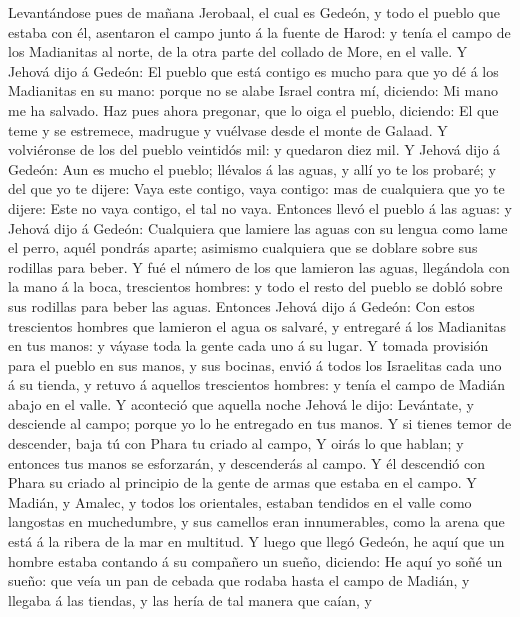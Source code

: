  Levantándose pues de mañana Jerobaal, el cual es Gedeón,
y todo el pueblo que estaba con él, asentaron el campo junto á la fuente
de Harod: y tenía el campo de los Madianitas al norte, de la otra parte
del collado de More, en el valle.  Y Jehová dijo á Gedeón:
El pueblo que está contigo es mucho para que yo dé á los Madianitas en
su mano: porque no se alabe Israel contra mí, diciendo: Mi mano me ha
salvado.  Haz pues ahora pregonar, que lo oiga el pueblo,
diciendo: El que teme y se estremece, madrugue y vuélvase desde el monte
de Galaad. Y volviéronse de los del pueblo veintidós mil: y quedaron
diez mil.  Y Jehová dijo á Gedeón: Aun es mucho el pueblo;
llévalos á las aguas, y allí yo te los probaré; y del que yo te dijere:
Vaya este contigo, vaya contigo: mas de cualquiera que yo te dijere:
Este no vaya contigo, el tal no vaya.  Entonces llevó el
pueblo á las aguas: y Jehová dijo á Gedeón: Cualquiera que lamiere las
aguas con su lengua como lame el perro, aquél pondrás aparte; asimismo
cualquiera que se doblare sobre sus rodillas para beber. 
Y fué el número de los que lamieron las aguas, llegándola con la mano á
la boca, trescientos hombres: y todo el resto del pueblo se dobló sobre
sus rodillas para beber las aguas.  Entonces Jehová dijo á
Gedeón: Con estos trescientos hombres que lamieron el agua os salvaré, y
entregaré á los Madianitas en tus manos: y váyase toda la gente cada uno
á su lugar.  Y tomada provisión para el pueblo en sus
manos, y sus bocinas, envió á todos los Israelitas cada uno á su tienda,
y retuvo á aquellos trescientos hombres: y tenía el campo de Madián
abajo en el valle.  Y aconteció que aquella noche Jehová
le dijo: Levántate, y desciende al campo; porque yo lo he entregado en
tus manos.  Y si tienes temor de descender, baja tú con
Phara tu criado al campo,  Y oirás lo que hablan; y
entonces tus manos se esforzarán, y descenderás al campo. Y él descendió
con Phara su criado al principio de la gente de armas que estaba en el
campo.  Y Madián, y Amalec, y todos los orientales,
estaban tendidos en el valle como langostas en muchedumbre, y sus
camellos eran innumerables, como la arena que está á la ribera de la mar
en multitud.  Y luego que llegó Gedeón, he aquí que un
hombre estaba contando á su compañero un sueño, diciendo: He aquí yo
soñé un sueño: que veía un pan de cebada que rodaba hasta el campo de
Madián, y llegaba á las tiendas, y las hería de tal manera que caían, y
